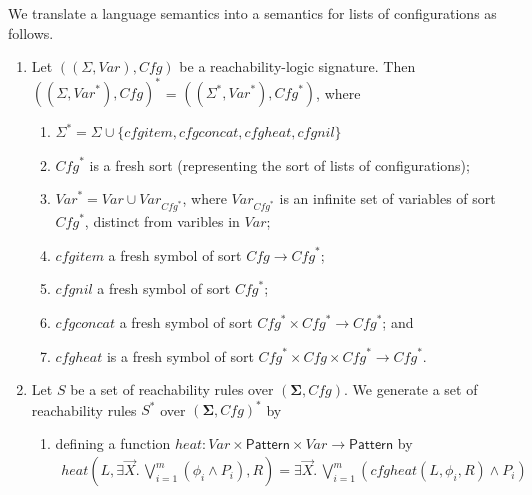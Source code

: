 \documentclass{article}
\newcommand{\Pattern}{\mathsf{Pattern}}
\begin{document}
\begin{definition}\label{def:starextension}
We translate a language semantics into a semantics for lists of configurations as follows.
\begin{enumerate}
    \item Let $((\Sigma, \mathit{Var}), \mathit{Cfg})$ be a reachability-logic signature.
          Then $((\Sigma, \mathit{Var}^*), \mathit{Cfg})^*$ = $((\Sigma^*, \mathit{Var}^*), \mathit{Cfg}^*)$,
          where
          \begin{enumerate}
              \item $\Sigma^* = \Sigma \cup \{ \mathit{cfgitem}, \mathit{cfgconcat}, \mathit{cfgheat}, \mathit{cfgnil} \}$
              \item $\mathit{Cfg}^*$ is a fresh sort (representing the sort of lists of configurations);
              \item $\mathit{Var}^* = \mathit{Var} \cup \mathit{Var}_{\mathit{Cfg}^*}$,
              where $\mathit{Var}_{\mathit{Cfg}^*}$ is an infinite set of variables of sort $\mathit{Cfg}^*$,
              distinct from varibles in $\mathit{Var}$;
              \item $\mathit{cfgitem}$ a fresh symbol of sort $\mathit{Cfg} \to \mathit{Cfg}^*$;
              \item $\mathit{cfgnil}$ a fresh symbol of sort $\mathit{Cfg}^*$;
              \item $\mathit{cfgconcat}$ a fresh symbol of sort $\mathit{Cfg}^* \times \mathit{Cfg}^* \to \mathit{Cfg}^*$; and
              \item $\mathit{cfgheat}$ is a fresh symbol of sort $\mathit{Cfg}^* \times \mathit{Cfg} \times \mathit{Cfg}^* \to \mathit{Cfg}^*$.
          \end{enumerate}
    \item Let $S$ be a set of reachability rules over $(\mathbf{\Sigma}, \mathit{Cfg})$.
          We generate a set of reachability rules $S^*$ over $(\mathbf{\Sigma}, \mathit{Cfg})^*$
          by
          \begin{enumerate}
              \item defining a function $\mathit{heat} : \mathit{Var} \times \Pattern \times \mathit{Var} \to \Pattern$ by
              \begin{align*}
                  \mathit{heat}(L, \exists \vec{X}.\, \bigvee_{i=1}^{m} (\phi_i \land P_i), R)
                  = \exists \vec{X}.\, \bigvee_{i=1}^{m} ( \mathit{cfgheat(L, \phi_i, R)} \land P_i)
              \end{align*}

\end{enumerate}
\end{enumerate}
\end{definition}
\end{document}
